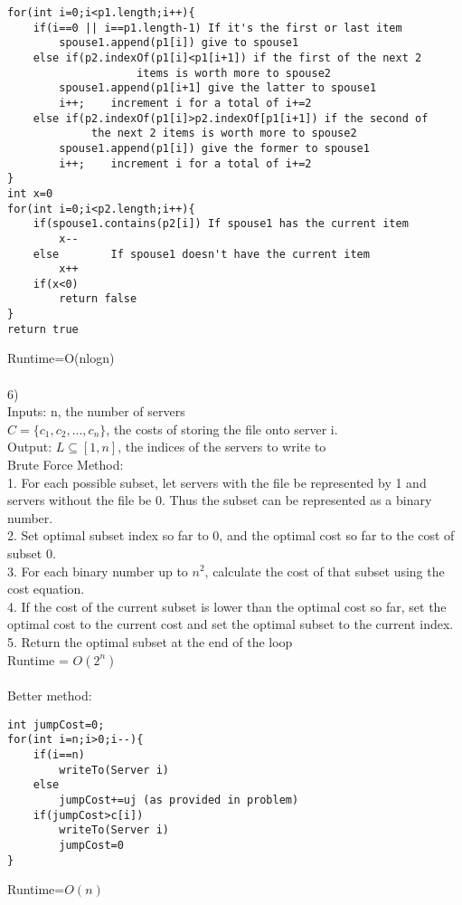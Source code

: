 \documentclass[a4paper,12pt]{article}
\begin{document}
\begin{lstlisting}
for(int i=0;i<p1.length;i++){
	if(i==0 || i==p1.length-1) If it's the first or last item
		spouse1.append(p1[i]) give to spouse1
	else if(p2.indexOf(p1[i]<p1[i+1]) if the first of the next 2 
					items is worth more to spouse2
		spouse1.append(p1[i+1] give the latter to spouse1
		i++;	increment i for a total of i+=2 
	else if(p2.indexOf(p1[i]>p2.indexOf[p1[i+1]) if the second of
			 the next 2 items is worth more to spouse2
		spouse1.append(p1[i]) give the former to spouse1
		i++;	increment i for a total of i+=2
}
int x=0	
for(int i=0;i<p2.length;i++){
	if(spouse1.contains(p2[i]) If spouse1 has the current item
		x-- 				
	else		If spouse1 doesn't have the current item
		x++
	if(x<0)
		return false
}
return true
\end{lstlisting}
Runtime=O(nlogn)\\\\
6)\\
Inputs: n, the number of servers\\
$C=\{c_1,c_2,...,c_n\}$, the costs of storing the file onto server i. \\
Output: $L \subseteq [1,n]$, the indices of the servers to write to\\
Brute Force Method:\\
1. For each possible subset, let servers with the file be represented by 1 and servers without the file be 0. Thus the subset can be represented as a binary number.\\
2. Set optimal subset index so far to 0, and the optimal cost so far to the cost of subset 0. \\
3. For each binary number up to $n^2$, calculate the cost of that subset using the cost equation.\\
4. If the cost of the current subset is lower than the optimal cost so far, set the optimal cost to the current cost and set the optimal subset to the current index. \\
5. Return the optimal subset at the end of the loop\\
Runtime = $O(2^n)$\\\\
Better method:\\
\begin{lstlisting}
int jumpCost=0;
for(int i=n;i>0;i--){
	if(i==n)
		writeTo(Server i)
	else
		jumpCost+=uj (as provided in problem)
	if(jumpCost>c[i])
		writeTo(Server i)
		jumpCost=0
}
\end{lstlisting}
Runtime=$O(n)$\\\\
\end{document}
